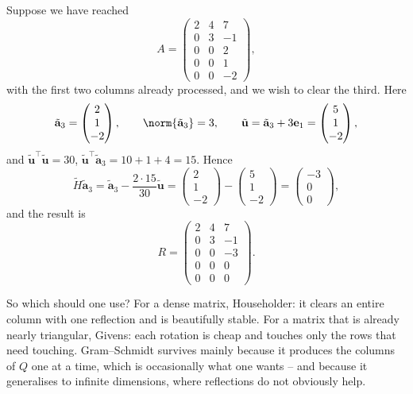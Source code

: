 \documentclass[a4paper]{scrartcl}
\begin{document}
\begin{example}
  Suppose we have reached
  $$
  A = \begin{pmatrix} 2&4&7\\0&3&-1\\0&0&2\\0&0&1\\0&0&-2\end{pmatrix},
  $$
  with the first two columns already processed, and we wish to clear the third. Here
  $$
  \tilde{\mathbf a}_3 = \begin{pmatrix}2\\1\\-2\end{pmatrix}, \qquad \norm{\tilde{\mathbf a}_3} = 3, \qquad \tilde{\mathbf u} = \tilde{\mathbf a}_3 + 3\mathbf e_1 = \begin{pmatrix}5\\1\\-2\end{pmatrix},
  $$
  and $\tilde{\mathbf u}^\top\tilde{\mathbf u} = 30$, $\tilde{\mathbf u}^\top\tilde{\mathbf a}_3 = 10 + 1 + 4 = 15$. Hence
  $$
  \tilde H\tilde{\mathbf a}_3 = \tilde{\mathbf a}_3 - \frac{2\cdot 15}{30}\tilde{\mathbf u} = \begin{pmatrix}2\\1\\-2\end{pmatrix} - \begin{pmatrix}5\\1\\-2\end{pmatrix} = \begin{pmatrix}-3\\0\\0\end{pmatrix},
  $$
  and the result is
  $$
  R = \begin{pmatrix}2&4&7\\0&3&-1\\0&0&-3\\0&0&0\\0&0&0\end{pmatrix}.
  $$
\end{example}

\begin{remark}
  So which should one use? For a dense matrix, Householder: it clears an entire column with one reflection and is beautifully stable. For a matrix that is already nearly triangular, Givens: each rotation is cheap and touches only the rows that need touching. Gram--Schmidt survives mainly because it produces the columns of $Q$ one at a time, which is occasionally what one wants -- and because it generalises to infinite dimensions, where reflections do not obviously help.
\end{remark}
\end{document}
